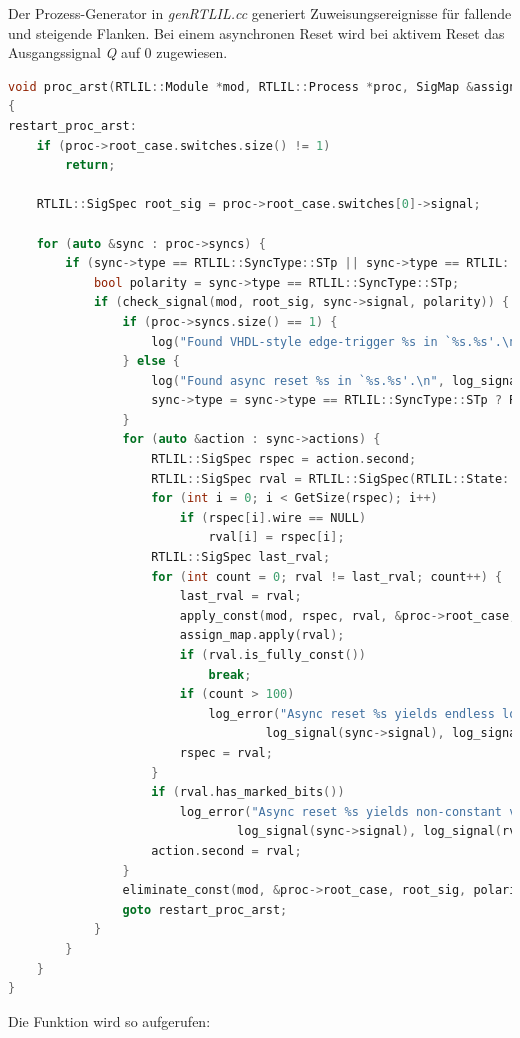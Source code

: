 \documentclass[11pt]{report}
\begin{document}
\begin{enumerate}
Der Prozess-Generator in \textit{genRTLIL.cc} generiert Zuweisungsereignisse für fallende und steigende Flanken.
Bei einem asynchronen Reset wird bei aktivem Reset das Ausgangssignal \textit{Q} auf 0 zugewiesen.   
\begin{lstlisting}[language=C++]
void proc_arst(RTLIL::Module *mod, RTLIL::Process *proc, SigMap &assign_map)
{
restart_proc_arst:
	if (proc->root_case.switches.size() != 1)
		return;

	RTLIL::SigSpec root_sig = proc->root_case.switches[0]->signal;

	for (auto &sync : proc->syncs) {
		if (sync->type == RTLIL::SyncType::STp || sync->type == RTLIL::SyncType::STn) {
			bool polarity = sync->type == RTLIL::SyncType::STp;
			if (check_signal(mod, root_sig, sync->signal, polarity)) {
				if (proc->syncs.size() == 1) {
					log("Found VHDL-style edge-trigger %s in `%s.%s'.\n", log_signal(sync->signal), mod->name.c_str(), proc->name.c_str());
				} else {
					log("Found async reset %s in `%s.%s'.\n", log_signal(sync->signal), mod->name.c_str(), proc->name.c_str());
					sync->type = sync->type == RTLIL::SyncType::STp ? RTLIL::SyncType::ST1 : RTLIL::SyncType::ST0;
				}
				for (auto &action : sync->actions) {
					RTLIL::SigSpec rspec = action.second;
					RTLIL::SigSpec rval = RTLIL::SigSpec(RTLIL::State::Sm, rspec.size());
					for (int i = 0; i < GetSize(rspec); i++)
						if (rspec[i].wire == NULL)
							rval[i] = rspec[i];
					RTLIL::SigSpec last_rval;
					for (int count = 0; rval != last_rval; count++) {
						last_rval = rval;
						apply_const(mod, rspec, rval, &proc->root_case, root_sig, polarity, false);
						assign_map.apply(rval);
						if (rval.is_fully_const())
							break;
						if (count > 100)
							log_error("Async reset %s yields endless loop at value %s for signal %s.\n",
									log_signal(sync->signal), log_signal(rval), log_signal(action.first));
						rspec = rval;
					}
					if (rval.has_marked_bits())
						log_error("Async reset %s yields non-constant value %s for signal %s.\n",
								log_signal(sync->signal), log_signal(rval), log_signal(action.first));
					action.second = rval;
				}
				eliminate_const(mod, &proc->root_case, root_sig, polarity);
				goto restart_proc_arst;
			}
		}
	}
}
\end{lstlisting}
Die Funktion wird so aufgerufen:

\end{enumerate}
\end{document}
